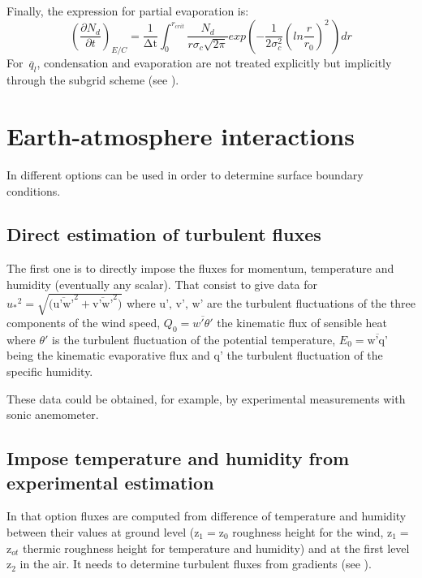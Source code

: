 Finally, the expression for partial evaporation is:
\begin{equation}
\left( \frac{\partial N_{d}}{\partial t}
\right)_{E/C}=\frac{1}{\mathrm{\Delta t}}\int_{0}^{r_{crit}}
\frac{N_{d}}{r\sigma_{c}\sqrt {2\pi } } exp\left( -\frac{1}{2\sigma
_{c}^{2}}\left( ln\frac{r}{r_{0}} \right)^{2}\, \right)dr
\end{equation}
For $\overline{{\, q}_{l}}$, condensation and evaporation are not treated
explicitly but implicitly through the subgrid scheme (see \cite{Bouzereau:2007}).

\section{Earth-atmosphere interactions}
In \CS different options can be used in order to
determine surface boundary conditions.

\subsection{Direct estimation of turbulent fluxes}
The first one is to directly impose the fluxes for momentum, temperature and
humidity (eventually any scalar). That consist to give data for
${u_{\ast}} ^2 =\sqrt {\mbox{(}\overline {\mbox{u'w'}}^{2}+\overline {\mbox{v'w'}}^{2})} $ where
$\mbox{u',}\,\,\mbox{v',}\,\,\mbox{w'}$ are the turbulent fluctuations of
the three components of the wind speed,
\newline
\newline
$Q_{0} =\overline{w'\theta'}$ the kinematic flux of sensible heat where
$\theta '$ is the turbulent fluctuation of the potential temperature,
\newline
\newline
$E_{0} =\overline {\mbox{w'q'}} $ being the kinematic
evaporative flux and $\mbox{q'}$ the turbulent fluctuation of the specific
humidity.

These data could be obtained, for example, by experimental
measurements with sonic anemometer.

\subsection{Impose temperature and humidity from experimental estimation}
In that option fluxes are computed from difference of temperature and
humidity between their values at ground level (z$_{1}=$z$_{0}$ roughness
height for the wind, z$_{1}=$z$_{ot}$ thermic roughness height for
temperature and humidity) and at the first level z$_{2}$ in the air.
It needs to determine turbulent fluxes from gradients (see \cite{Musson_Genon:2007}).

